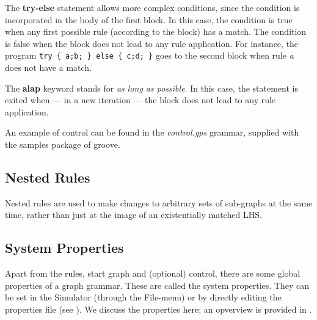 The \textbf{try-else} statement allows more complex conditions, since the condition is incorporated in the body of the first block. In this case, the condition is true when any first possible rule (according to the block) has a match. The condition is false when the block does not lead to any rule application. 
For instance, the program \texttt{try \{ a;b; \} else \{ c;d; \}} goes to the second block when rule \emph{a} does not have a match. 

The \textbf{alap} keyword stands for \emph{as long as possible}. In this case, the statement is exited when --- in a new iteration --- the block does not lead to any rule application. 

An example of control can be found in the \emph{control.gps} grammar, supplied with the samples package of groove.

\subsection{Nested Rules}

Nested rules are used to make changes to arbitrary sets of sub-graphs at the
same time, rather than just at the image of an existentially matched LHS.

\subsection{System Properties}

Apart from the rules, start graph and (optional) control, there are some global
properties of a graph grammar. These are called the system properties. They can
be set in the Simulator (through the \textsf{File}-menu) or by directly editing
the properties file (see ). We discuss the
properties here; an opverview is provided in .

